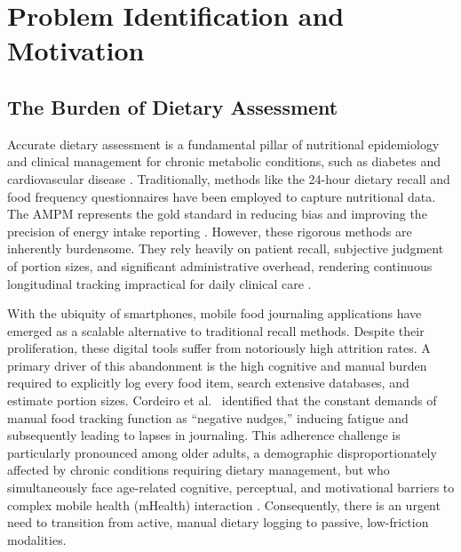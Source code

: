 \section{Problem Identification and Motivation}
\label{sec:problem-id}

\subsection{The Burden of Dietary Assessment}
\label{sec:ampm-burden}

Accurate dietary assessment is a fundamental pillar of nutritional epidemiology and clinical management for chronic metabolic conditions, such as diabetes and cardiovascular disease \citep{willettNutritionalEpidemiology2012,evertNutritionTherapyAdults2019}. Traditionally, methods like the 24-hour dietary recall and food frequency questionnaires have been employed to capture nutritional data. The AMPM represents the gold standard in reducing bias and improving the precision of energy intake reporting \citep{moshfeghUSDepartmentAgriculture2008,blantonUSDAAutomatedMultiplePass2006}. However, these rigorous methods are inherently burdensome. They rely heavily on patient recall, subjective judgment of portion sizes, and significant administrative overhead, rendering continuous longitudinal tracking impractical for daily clinical care \citep{shimDietaryAssessmentMethods2014}.

With the ubiquity of smartphones, mobile food journaling applications have emerged as a scalable alternative to traditional recall methods. Despite their proliferation, these digital tools suffer from notoriously high attrition rates. A primary driver of this abandonment is the high cognitive and manual burden required to explicitly log every food item, search extensive databases, and estimate portion sizes. Cordeiro et al.\ \citep{cordeiroBarriersNegativeNudges2015} identified that the constant demands of manual food tracking function as ``negative nudges,'' inducing fatigue and subsequently leading to lapses in journaling. This adherence challenge is particularly pronounced among older adults, a demographic disproportionately affected by chronic conditions requiring dietary management, but who simultaneously face age-related cognitive, perceptual, and motivational barriers to complex mobile health (mHealth) interaction \citep{wildenbosAgingBarriersInfluencing2018,czajaImpactAgingAccess2007}. Consequently, there is an urgent need to transition from active, manual dietary logging to passive, low-friction modalities.

